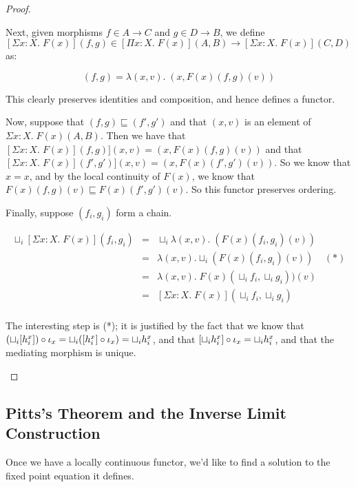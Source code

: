\begin{proof}
\begin{enumerate}
Next, given morphisms $f \in A \to C$ and $g \in D \to B$, we define
$[\Sigma x:X.\; F(x)](f,g) \in [\Pi x:X.\; F(x)](A,B) \to [\Sigma x:X.\; F(x)](C,D)$
as:

\begin{displaymath}
  [\Sigma x:X.\; F(x)](f,g) = \lambda (x, v).\; (x, F(x)(f,g)(v))
\end{displaymath}

This clearly preserves identities and composition, and hence defines
a functor. 

Now, suppose that $(f,g) \sqsubseteq (f',g')$ and that $(x,v)$ is
an element of $\Sigma x:X.\; F(x)(A,B)$. Then we have that
$[\Sigma x:X.\;F(x)](f,g)](x,v) = (x,F(x)(f,g)(v))$ and that
$[\Sigma x:X.\;F(x)](f',g')](x,v) = (x,F(x)(f',g')(v))$. So we
know that $x=x$, and by the local continuity of $F(x)$, we know
that $F(x)(f,g)(v) \sqsubseteq F(x)(f',g')(v)$. So this functor
preserves ordering. 

Finally, suppose $(f_i, g_i)$ form a chain. 

\begin{displaymath}
\begin{array}{lcl}
\sqcup_i [\Sigma x:X.\;F(x)](f_i,g_i) 
& = & \sqcup_i \lambda (x,v).\; (F(x)(f_i,g_i)(v)) \\
& = & \lambda (x,v). \sqcup_i (F(x)(f_i,g_i)(v)) \;\;\;\; (*) \\
& = & \lambda (x,v).\; F(x)(\sqcup_i f_i, \sqcup_i g_i))(v) \\
& = & [\Sigma x:X.\;F(x)](\sqcup_i f_i, \sqcup_i g_i) \\
\end{array}
\end{displaymath}

The interesting step is (*); it is justified by the fact
that we know that 
$(\sqcup_i [h^x_i]) \circ \iota_{x} =  
\sqcup_i ([h^x_i] \circ \iota_{x}) =  \sqcup_i h^x_i$, 
and that $[\sqcup_i h^x_i] \circ \iota_{x} = \sqcup_i h^x_i$, 
and that the mediating morphism is unique.
\end{enumerate}
\end{proof}

\subsection{Pitts's Theorem and the Inverse Limit Construction}

Once we have a locally continuous functor, we'd like to find a
solution to the fixed point equation it defines. 

